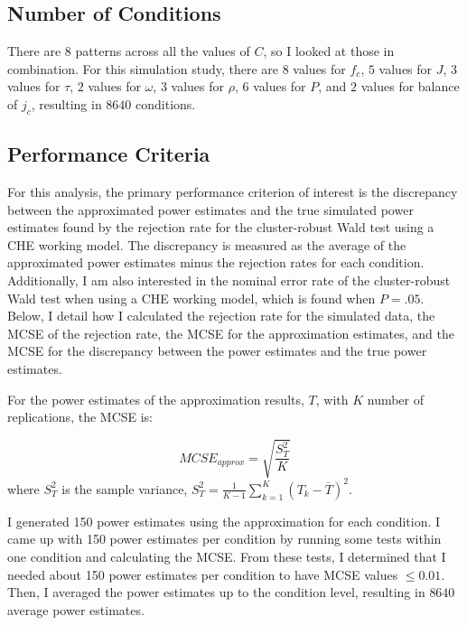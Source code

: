 

\subsection{Number of Conditions}

There are $8$ patterns across all the values of $C$, so I looked at those in combination. For this simulation study, there are $8$ values for $f_c$, $5$ values for $J$, $3$ values for $\tau$, $2$ values for $\omega$, $3$ values for $\rho$, $6$ values for $P$, and $2$ values for balance of $j_c$, resulting in $8640$ conditions.  


\subsection{Performance Criteria}
For this analysis, the primary performance criterion of interest is the discrepancy between the approximated power estimates and the true simulated power estimates found by the rejection rate for the cluster-robust Wald test using a CHE working model. The discrepancy is measured as the average of the approximated power estimates minus the rejection rates for each condition. Additionally, I am also interested in the nominal error rate of the cluster-robust Wald test when using a CHE working model, which is found when $ P=.05$. Below, I detail how I calculated the rejection rate for the simulated data, the MCSE of the rejection rate, the MCSE for the approximation estimates, and the MCSE for the discrepancy between the power estimates and the true power estimates. 

For the power estimates of the approximation results, $T$, with $K$ number of replications, the MCSE is:

\begin{equation}
    MCSE_{approx} = \sqrt{\frac{S^2_T}{K}}
\end{equation}
where $S_T^2$ is the sample variance, $S_T^2 = \frac{1}{K-1}\sum_{k=1}^K(T_k - \overline{T})^2$. 

I generated 150 power estimates using the approximation for each condition. I came up with 150 power estimates per condition by running some tests within one condition and calculating the MCSE. From these tests, I determined that I needed about 150 power estimates per condition to have MCSE values $\leq 0.01$. Then, I averaged the power estimates up to the condition level, resulting in $8640$ average power estimates.

